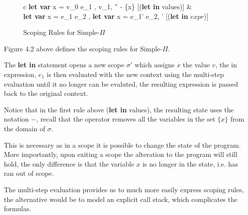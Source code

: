 \documentclass[a4paper,12pt]{report}
\begin{document}
\begin{figure}[H]
  \begin{center}
    \begin{tabular}{c}
      {\langle\textbf{let var }x = v_0  e_1 , \sigma \rangle 
      \longrightarrow \langle v_1, '' - \{x\} \rangle} [(\textbf{let in} values)] 
      & \\
      {\langle \textbf{let var }x = e_1  e_2 , \sigma \rangle 
      \longrightarrow \langle\textbf{let var }x = e_1'  e_2, \sigma' \rangle} 
      [(\textbf{let in} $expr$)]
    \end{tabular}
  \end{center}
  \caption{Scoping Rules for Simple-$\Pi$}
\end{figure}

\par
Figure 4.2 above defines the scoping rules for Simple-$\Pi$.

\par
The \textbf{let in} statement opens a new scope $\sigma'$ which 
assigns $x$ the value $v$, the in expression, $e_1$ is then evaluated with the 
new context using the multi-step evaluation until it no longer can be evaluted, 
the resulting expression is passed back to the original context.

\par 
Notice that in the first rule above (\textbf{let in } values), the resulting state 
uses the notation $-$, recall that the operator removes all the variables in the set 
$\{x\}$ from the domain of $\sigma$. 

\par
This is necessary as in a scope it is possible to change the state of the 
program. More importantly, upon exiting a scope the alteration to the program 
will still hold, the only difference is that the variable $x$ is no longer in 
the state, i.e. has ran out of scope.

\par
The multi-step evaluation provides us to much more easily express scoping rules, 
the alternative would be to model an explicit call stack, which complicates the 
formulas.
\end{document}
